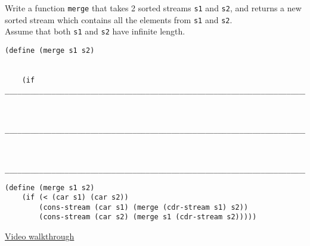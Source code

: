\question Write a function \lstinline$merge$ that takes 2 sorted streams
\lstinline$s1$ and \lstinline$s2$, and returns a new sorted stream which
contains all the elements from \lstinline$s1$ and \lstinline$s2$.\\
Assume that both \texttt{s1} and \texttt{s2} have infinite length.

\begin{lstlisting}
(define (merge s1 s2)


    (if _________________________________________________________________________


        _________________________________________________________________________


        _________________________________________________________________________))
\end{lstlisting}
\begin{solution}[0cm]
\begin{lstlisting}
(define (merge s1 s2)
    (if (< (car s1) (car s2))
        (cons-stream (car s1) (merge (cdr-stream s1) s2))
        (cons-stream (car s2) (merge s1 (cdr-stream s2)))))
\end{lstlisting}
\href{https://youtu.be/AYKHLcMJmJ4}{Video walkthrough}
\end{solution}
